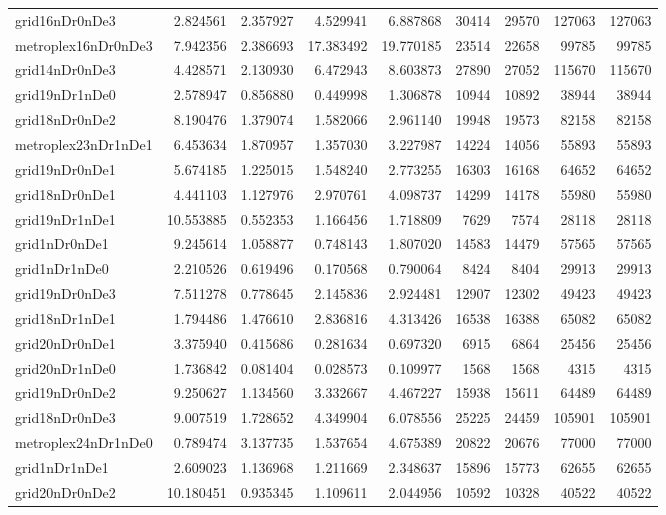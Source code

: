 \begin{longtable}{|l|r|r|r|r|r|r|r|r|}
grid16nDr0nDe3 & 2.824561 & 2.357927 & 4.529941 & 6.887868 & 30414 & 29570 & 127063 & 127063 \\
metroplex16nDr0nDe3 & 7.942356 & 2.386693 & 17.383492 & 19.770185 & 23514 & 22658 & 99785 & 99785 \\
grid14nDr0nDe3 & 4.428571 & 2.130930 & 6.472943 & 8.603873 & 27890 & 27052 & 115670 & 115670 \\
grid19nDr1nDe0 & 2.578947 & 0.856880 & 0.449998 & 1.306878 & 10944 & 10892 & 38944 & 38944 \\
grid18nDr0nDe2 & 8.190476 & 1.379074 & 1.582066 & 2.961140 & 19948 & 19573 & 82158 & 82158 \\
metroplex23nDr1nDe1 & 6.453634 & 1.870957 & 1.357030 & 3.227987 & 14224 & 14056 & 55893 & 55893 \\
grid19nDr0nDe1 & 5.674185 & 1.225015 & 1.548240 & 2.773255 & 16303 & 16168 & 64652 & 64652 \\
grid18nDr0nDe1 & 4.441103 & 1.127976 & 2.970761 & 4.098737 & 14299 & 14178 & 55980 & 55980 \\
grid19nDr1nDe1 & 10.553885 & 0.552353 & 1.166456 & 1.718809 & 7629 & 7574 & 28118 & 28118 \\
grid1nDr0nDe1 & 9.245614 & 1.058877 & 0.748143 & 1.807020 & 14583 & 14479 & 57565 & 57565 \\
grid1nDr1nDe0 & 2.210526 & 0.619496 & 0.170568 & 0.790064 & 8424 & 8404 & 29913 & 29913 \\
grid19nDr0nDe3 & 7.511278 & 0.778645 & 2.145836 & 2.924481 & 12907 & 12302 & 49423 & 49423 \\
grid18nDr1nDe1 & 1.794486 & 1.476610 & 2.836816 & 4.313426 & 16538 & 16388 & 65082 & 65082 \\
grid20nDr0nDe1 & 3.375940 & 0.415686 & 0.281634 & 0.697320 & 6915 & 6864 & 25456 & 25456 \\
grid20nDr1nDe0 & 1.736842 & 0.081404 & 0.028573 & 0.109977 & 1568 & 1568 & 4315 & 4315 \\
grid19nDr0nDe2 & 9.250627 & 1.134560 & 3.332667 & 4.467227 & 15938 & 15611 & 64489 & 64489 \\
grid18nDr0nDe3 & 9.007519 & 1.728652 & 4.349904 & 6.078556 & 25225 & 24459 & 105901 & 105901 \\
metroplex24nDr1nDe0 & 0.789474 & 3.137735 & 1.537654 & 4.675389 & 20822 & 20676 & 77000 & 77000 \\
grid1nDr1nDe1 & 2.609023 & 1.136968 & 1.211669 & 2.348637 & 15896 & 15773 & 62655 & 62655 \\
grid20nDr0nDe2 & 10.180451 & 0.935345 & 1.109611 & 2.044956 & 10592 & 10328 & 40522 & 40522 \\

\end{longtable}
